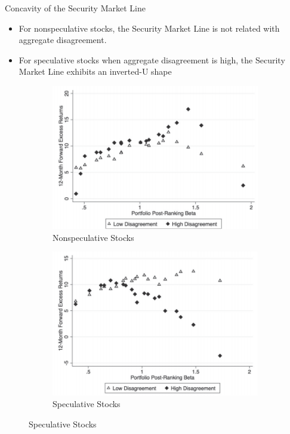 \documentclass{beamer}
\begin{document}
\begin{frame}{Concavity of the Security Market Line}
\begin{itemize}
\tiny
\item For nonspeculative stocks, the Security Market Line is not related with aggregate disagreement. 
\item For speculative stocks when aggregate disagreement is high, the Security Market Line exhibits an inverted-U shape
\end{itemize}
\begin{figure}
\begin{subfigure}[t]{.45\linewidth}
    \centering
    \tiny
    \includegraphics[width=1\linewidth]{7}
    \caption{Nonspeculative Stocks}
  \end{subfigure}
  \begin{subfigure}[t]{.45\linewidth}
    \centering
    \tiny
    \includegraphics[width=1\linewidth]{8}
    \caption{Speculative Stocks}
  \end{subfigure}
\end{figure}
\end{frame}
\end{document}
